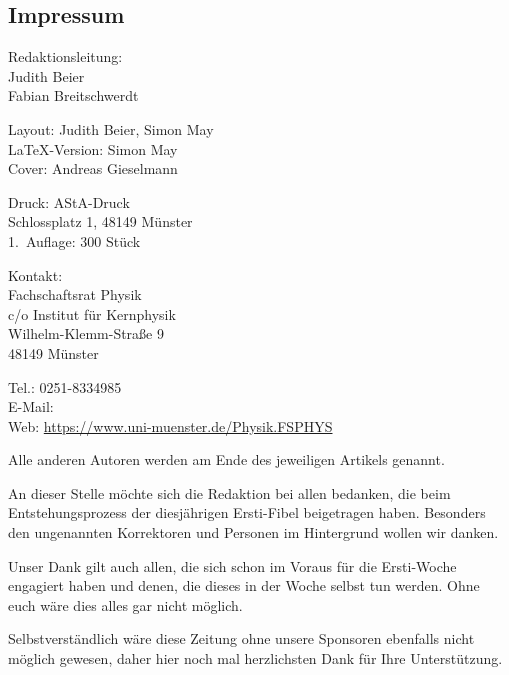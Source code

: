 \begin{multicols*}{2}
\section*{Impressum}
\vspace{-0.5cm}

\begin{center}
{\large
Redaktionsleitung:\\[0.2\baselineskip]
\normalsize
Judith Beier\\
Fabian Breitschwerdt}

\footnotesize
Layout: Judith Beier, Simon May\\
\LaTeX-Version: Simon May\\
Cover: Andreas Gieselmann

Druck: AStA-Druck\\
Schlossplatz 1, 48149 Münster\\
1.\ Auflage: 300 Stück

\medskip

{\large Kontakt:\\[0.2\baselineskip]}
Fachschaftsrat Physik\\
c/o Institut für Kernphysik\\
Wilhelm-Klemm-Straße 9\\
48149 Münster

Tel.: 0251-8334985\\
E-Mail: \\
Web: \url{https://www.uni-muenster.de/Physik.FSPHYS}
\end{center}

\footnotesize
Alle anderen Autoren werden am Ende des jeweiligen
Artikels genannt.

An dieser Stelle möchte sich die Redaktion bei allen bedanken, die beim Entstehungsprozess der diesjährigen Ersti-Fibel beigetragen haben. Besonders den ungenannten Korrektoren und Personen im Hintergrund wollen wir danken.

Unser Dank gilt auch allen, die sich schon im Voraus für die Ersti-Woche engagiert haben und denen, die dieses in der Woche selbst tun werden. Ohne euch wäre dies alles gar nicht möglich.

Selbstverständlich wäre diese Zeitung ohne unsere Sponsoren
%
%
ebenfalls nicht möglich gewesen, daher hier noch mal herzlichsten Dank für Ihre Unterstützung.
\end{multicols*}


\clearpage

